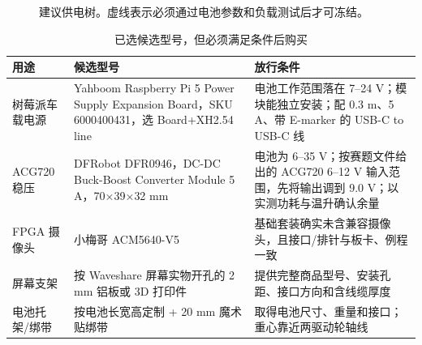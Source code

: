 \documentclass[UTF8,a4paper,zihao=-4,fontset=none]{ctexart}
\begin{document}
\begin{figure}[H]\centering
{}
\caption{建议供电树。虚线表示必须通过电池参数和负载测试后才可冻结。}
\end{figure}

\begin{table}[H]\small
\caption{已选候选型号，但必须满足条件后购买}
\begin{tabularx}{\linewidth}{@{}L{3.3cm}L{4.8cm}Y@{}}\toprule
\textbf{用途} & \textbf{候选型号} & \textbf{放行条件}\\\midrule
树莓派车载电源 & Yahboom Raspberry Pi 5 Power Supply Expansion Board，SKU 6000400431，选 Board+XH2.54 line & 电池工作范围落在 7--24 V；模块能独立安装；配 0.3 m、5 A、带 E-marker 的 USB-C to USB-C 线\cite{yahboom}\\
ACG720 稳压 & DFRobot DFR0946，DC-DC Buck-Boost Converter Module 5 A，70$\times$39$\times$32 mm & 电池为 6--35 V；按赛题文件给出的 ACG720 6--12 V 输入范围，先将输出调到 9.0 V；以实测功耗与温升确认余量\cite{dfpower,contest}\\
FPGA 摄像头 & 小梅哥 ACM5640-V5 & 基础套装确实未含兼容摄像头，且接口/排针与板卡、例程一致\cite{cammanual}\\
屏幕支架 & 按 Waveshare 屏幕实物开孔的 2 mm 铝板或 3D 打印件 & 提供完整商品型号、安装孔距、接口方向和含线缆厚度\\
电池托架/绑带 & 按电池长宽高定制 + 20 mm 魔术贴绑带 & 取得电池尺寸、重量和接口；重心靠近两驱动轮轴线\\\bottomrule
\end{tabularx}
\end{table}
\end{document}
